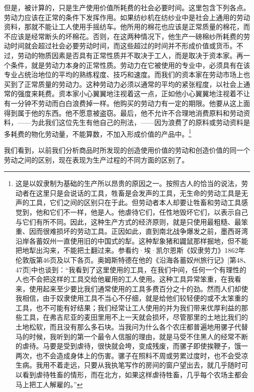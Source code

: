 \documentclass{ctexbook}
\begin{document}
    但是，被计算的，只是生产使用价值所耗费的社会必要时间。这里包含下列各点。劳动力应该在正常的条件下发挥作用。如果纺纱机在纺纱业中是社会上通用的劳动资料，那就不能让工人使用手摇纺车。他所用的棉花也应该是正常质量的棉花，而不应该是经常断头的坏棉花。否则，在这两种情况下，他生产一磅棉纱所耗费的劳动时间就会超过社会必要劳动时间，而这些超过的时间并不形成价值或货币。不过，劳动的物质因素是否具有正常性质并不取决于工人，而是取决于资本家。再一个条件，就是劳动力本身的正常性质。劳动力在它被使用的专业中，必须具有在该专业占统治地位的平均的熟练程度、技巧和速度。而我们的资本家在劳动市场上也买到了正常质量的劳动力。这种劳动力必须以通常的平均的紧张程度，以社会上通常的强度来耗费。资本家小心翼翼地注视着这一点，正如他小心翼翼地注视着不让有一分钟不劳动而白白浪费掉一样。他购买的劳动力有一定的期限。他要从这上面得到属于他的东西。他不愿意被盗窃。最后，他不允许不合理地消费原料和劳动资料，——为此我们这位先生有他自己的刑法，——因为浪费了的原料或劳动资料是多耗费的物化劳动量，不能算数，不加入形成价值的产品中。\footnote{这是以奴隶制为基础的生产所以昂贵的原因之一。按照古人的恰当的说法，劳动者在这里只是会说话的工具，牲畜是会发声的工具，无生命的劳动工具是无声的工具，它们之间的区别只在于此。但劳动者本人却要让牲畜和劳动工具感觉到，他和它们不一样，他是人。他虐待它们，任性地毁坏它们，以表示自己与它们有所不同。因此，这种生产方式的经济原则，就是只使用最粗糙、最笨重、因而很难损坏的劳动工具。正因如此，直到南北战争爆发之前，墨西哥湾沿岸各蓄奴州一直使用旧的中国式的犁。这种犁象猪和鼹鼠那样掘地，但不能把地犁出沟来，不能把土翻过来。参看约·埃·凯尔恩斯《奴隶劳力》1862年伦敦版第46页及以下各页。奥姆斯特德在他的《沿海各蓄奴州旅行记》[第48、47页]中也谈到：“我看到了这里使用的工具，在我们中间，任何一个有理性的人也不会把这样的工具交给他雇用的工人使用。这种工具异常笨重，在我看来，使用起来至少要比我们通常使用的工具多费百分之十的劲。然而人们却使我相信，由于奴隶使用工具不当心不仔细，就是给他们较轻便的或不太笨重的工具，也不可能有好结果；我们经常让工人使用的并为我们带来优厚利益的那些工具，在弗吉尼亚的麦田里用不上一天就会损坏，尽管那里的土地比我们的土地松软，而且没有那么多石块。当我问为什么各个农庄都普遍地用骡子代替马的时候，我听到的第一个最令人信服的理由，就是马受不住黑人的经常不断的虐待。马要是受到虐待，很快就会垮，变成残废，而骡子即使挨鞭子，饿一两次，也不会造成身体上的伤害。骡子在照料不周或劳累过度时，也不会受凉生病。我用不着走远，只要从我执笔写作的房间的窗户望出去，就几乎随时可以看到虐待牲畜的情形，而在北方，如果这样虐待牲畜，几乎每个农场主都会马上把工人解雇的。”}
    
    我们看到，以前我们分析商品时所发现的创造使用价值的劳动和创造价值的同一个劳动之间的区别，现在表现为生产过程的不同方面的区别了。
    
\end{document}
